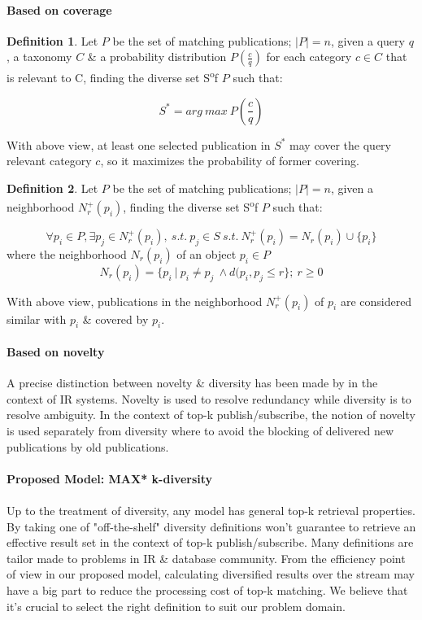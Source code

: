 \documentclass[a4paper,12pt,oneside]{book}
\theoremstyle{definition}
\newtheorem{definition}{Definition}[section]
\theoremstyle{remark}
\begin{document}
\paragraph{Based on coverage}
\begin{definition}
Let $P$ be the set of matching publications; $|P| = n$, given a query $q$, a taxonomy $C$ \& a probability distribution $P(\frac{c}{q})$ for each category $c \in C$ that is relevant to C, finding the diverse set S\textsuperscript* of $P$ such that:
\begin{center}
\[ S^* = arg\ max\ P(\frac{c}{q}) \]
\end{center}
With above view, at least one selected publication in $S^*$ may cover the query relevant category $c$, so it maximizes the probability of former covering.
\end{definition}

\begin{definition}
Let $P$ be the set of matching publications; $|P| = n$, given a neighborhood $N^+_r(p_i)$, finding the diverse set S\textsuperscript* of $P$ such that:
\begin{center}
\[ \forall p_i \in P, \exists p_j \in N^+_r(p_i),\ s.t.\ p_j \in S\
s.t.\   N^+_r(p_i) =  N_r(p_i) \cup \{ p_i \} \]
where the neighborhood $N_r(p_i)$ of an object $p_i \in P$ \\
\[ N_r(p_i) = \{p_i\ |\ p_i \neq p_j\ \wedge d(p_{i}, p_{j} \leq r\};\ r\geq0 \]
\end{center}
With above view, publications in the neighborhood $N^+_r(p_i)$ of $p_i$ are considered similar with $p_i$ \& covered by $p_i$.
\end{definition}

\paragraph{Based on novelty}
A precise distinction between novelty \& diversity has been made by \cite{Clarke2008} in the context of \ac{IR} systems. Novelty is used to resolve redundancy while diversity is to resolve ambiguity. In the context of top-k publish/subscribe, the notion of novelty is used separately from diversity where to avoid the blocking of delivered new publications by old publications.  

\paragraph{Proposed Model: MAX* k-diversity}
\paragraph*{}
Up to the treatment of diversity, any model has general top-k retrieval properties. By taking one of "off-the-shelf" diversity definitions won't guarantee to retrieve an effective result set in the context of top-k publish/subscribe. Many definitions are tailor made to problems in \ac{IR} \& database community. From the efficiency point of view in our proposed model, calculating diversified results over the stream may have a big part to reduce the processing cost of top-k matching. We believe that it's crucial to select the right definition to suit our problem domain.
\end{document}
